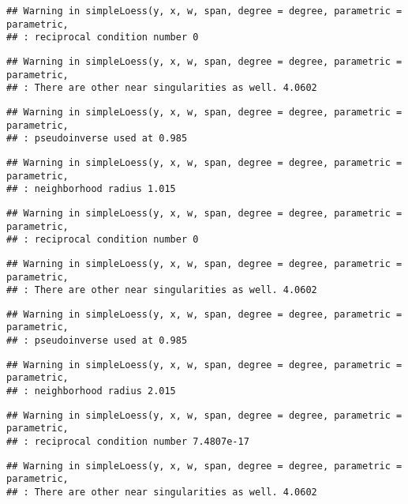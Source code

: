 \documentclass[
]{article}
\begin{document}
\begin{verbatim}
## Warning in simpleLoess(y, x, w, span, degree = degree, parametric = parametric,
## : reciprocal condition number 0
\end{verbatim}

\begin{verbatim}
## Warning in simpleLoess(y, x, w, span, degree = degree, parametric = parametric,
## : There are other near singularities as well. 4.0602
\end{verbatim}

\begin{verbatim}
## Warning in simpleLoess(y, x, w, span, degree = degree, parametric = parametric,
## : pseudoinverse used at 0.985
\end{verbatim}

\begin{verbatim}
## Warning in simpleLoess(y, x, w, span, degree = degree, parametric = parametric,
## : neighborhood radius 1.015
\end{verbatim}

\begin{verbatim}
## Warning in simpleLoess(y, x, w, span, degree = degree, parametric = parametric,
## : reciprocal condition number 0
\end{verbatim}

\begin{verbatim}
## Warning in simpleLoess(y, x, w, span, degree = degree, parametric = parametric,
## : There are other near singularities as well. 4.0602
\end{verbatim}

\begin{verbatim}
## Warning in simpleLoess(y, x, w, span, degree = degree, parametric = parametric,
## : pseudoinverse used at 0.985
\end{verbatim}

\begin{verbatim}
## Warning in simpleLoess(y, x, w, span, degree = degree, parametric = parametric,
## : neighborhood radius 2.015
\end{verbatim}

\begin{verbatim}
## Warning in simpleLoess(y, x, w, span, degree = degree, parametric = parametric,
## : reciprocal condition number 7.4807e-17
\end{verbatim}

\begin{verbatim}
## Warning in simpleLoess(y, x, w, span, degree = degree, parametric = parametric,
## : There are other near singularities as well. 4.0602
\end{verbatim}
\end{document}
